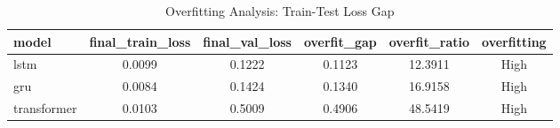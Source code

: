 \begin{table}[htbp]
\caption{Overfitting Analysis: Train-Test Loss Gap}
\label{tab:overfitting_analysis}
\begin{tabular}{lccccc}
\toprule
model & final_train_loss & final_val_loss & overfit_gap & overfit_ratio & overfitting \\
\midrule
lstm & 0.0099 & 0.1222 & 0.1123 & 12.3911 & High \\
gru & 0.0084 & 0.1424 & 0.1340 & 16.9158 & High \\
transformer & 0.0103 & 0.5009 & 0.4906 & 48.5419 & High \\
\bottomrule
\end{tabular}
\end{table}
